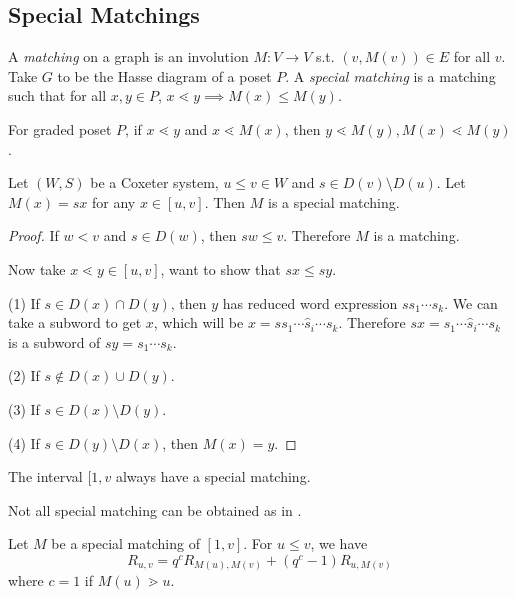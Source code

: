 \subsection{Special Matchings}

\begin{definition}
	A \emph{matching} on a graph is an involution $M:V\to V$ s.t. $(v,M(v))\in E$ for all $v$. Take $G$ to be the Hasse diagram of a poset $P$. A \emph{special matching} is a matching such that for all $x,y\in P$, $x\lessdot y\implies M(x)\leq M(y)$.
\end{definition}
\begin{remark}
	For graded poset $P$, if $x\lessdot y$ and $x\lessdot M(x)$, then $y\lessdot M(y),M(x)\lessdot M(y)$.
\end{remark}
\begin{example}
	
\end{example}
\begin{theorem}\label{thm:sm_exists}
	Let $(W,S)$ be a Coxeter system, $u\leq v\in W$ and $s\in D(v)\setminus D(u)$. Let $M(x)=sx$ for any $x\in [u,v]$. Then $M$ is a special matching.
\end{theorem}
\begin{proof}
	If $w<v$ and $s\in D(w)$, then $sw\leq v$. Therefore $M$ is a matching.

Now take $x\lessdot y\in [u,v]$, want to show that $sx\leq sy$.	

(1) If $s\in D(x)\cap D(y)$, then $y$ has reduced word expression $ss_1\cdots s_k$. We can take a subword to get $x$, which will be $x=s s_1\cdots\hat s_i\cdots s_k$. Therefore $sx=s_1\cdots\hat s_i\cdots s_k$ is a subword of $sy=s_1\cdots s_k$.

(2) If $s\notin D(x)\cup D(y)$.

(3) If $s\in D(x)\setminus D(y)$.

(4) If $s\in D(y)\setminus D(x)$, then $M(x)=y$.

	
\end{proof}
\begin{corollary}
	The interval $[1,v$ always have a special matching.
\end{corollary}
\begin{remark}
	Not all special matching can be obtained as in .
\end{remark}
\begin{theorem}
	Let $M$ be a special matching of $[1,v]$. For $u\leq v$, we have%
	\begin{equation}
		R_{u,v} = q^c R_{M(u),M(v)}+ (q^c-1) R_{u,M(v)}
	\end{equation}
	where $c=1$ if $M(u)\gtrdot u$.
 \end{theorem}
